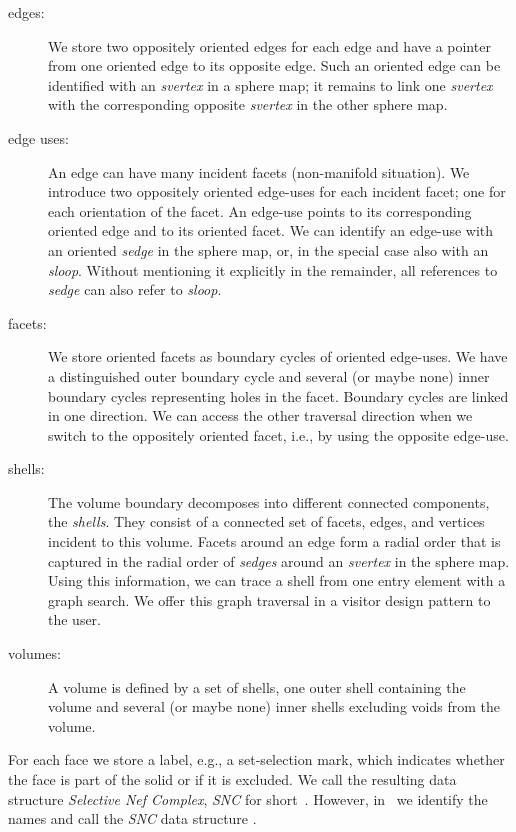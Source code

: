 \begin{description}
    \item[edges:] 
        We store two oppositely oriented edges for each edge
        and have a pointer from one oriented edge to its opposite edge.
        Such an oriented edge can be identified with an \emph{svertex}
        in a sphere map; it remains to link one \emph{svertex} with
        the corresponding opposite \emph{svertex} in the other sphere map.
    \item[edge uses:]
        An edge can have many incident facets (non-manifold situation).
        We introduce two oppositely oriented edge-uses for each incident
        facet; one for each orientation of the facet. An edge-use points 
        to its corresponding oriented edge and to its oriented facet.   
        We can identify an edge-use with an oriented \emph{sedge} in the 
        sphere map, or, in the special case also with an
        \emph{sloop}. Without mentioning it explicitly in the
        remainder, all references to \emph{sedge\/} can also refer to
        \emph{sloop}.
    \item[facets:]
        We store oriented facets as boundary cycles of oriented 
        edge-uses. We have a distinguished outer boundary cycle and 
        several (or maybe none) inner boundary cycles representing holes
        in the facet. Boundary cycles are linked in one direction. We can 
        access the other traversal direction when we switch to the oppositely
        oriented facet, i.e., by using the opposite edge-use.
    \item[shells:]
        The volume boundary decomposes into different connected
        components, the \emph{shells}. They consist of a connected set
        of facets, edges, and vertices incident to this volume. Facets 
        around an edge form a radial order that is captured in the
        radial order of \emph{sedges} around an \emph{svertex} in the
        sphere map. Using this information, we can trace a shell from
        one entry element with a graph search. We offer this graph
        traversal in a visitor design pattern to the user.
    \item[volumes:]
        A volume is defined by a set of shells, one outer shell containing
        the volume and several (or maybe none) inner shells excluding voids
        from the volume.
\end{description}

For each face we store a label, e.g., a set-selection mark, which
indicates whether the face is part of the solid or if it is
excluded. We call the resulting data structure \emph{Selective Nef
Complex}, \emph{SNC} for short~\cite{cgal:ghhkm-bosnc-03}. However, in
\cgal\ we identify the names and call the \emph{SNC} data structure
. 

